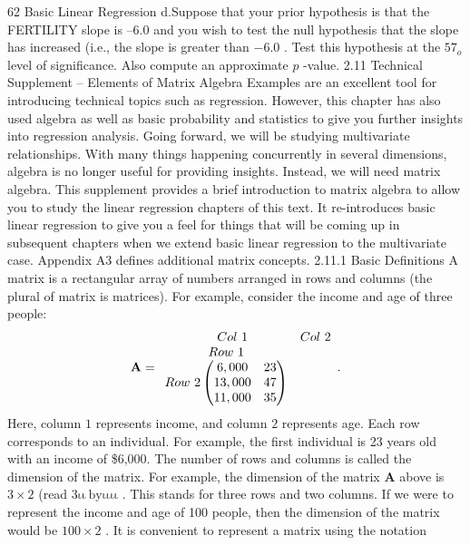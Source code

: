 \documentclass[11pt]{article}
\begin{document}
62 Basic Linear Regression
d.Suppose that your prior hypothesis is that the FERTILITY slope is --6.0
 and you wish to test the null hypothesis that the slope has increased
(i.e., the slope is greater than \(- 6 . 0\) . Test this hypothesis at the \(5 7_{o}\)
 level of significance. Also compute an approximate \(p\) -value.
 2.11 Technical Supplement -- Elements of Matrix Algebra
Examples are an excellent tool for introducing technical topics such as regression.
However, this chapter has also used algebra as well as basic probability and
statistics to give you further insights into regression analysis. Going forward,
we will be studying multivariate relationships. With many things happening
concurrently in several dimensions, algebra is no longer useful for providing
insights. Instead, we will need matrix algebra. This supplement provides a brief
 introduction to matrix algebra to allow you to study the linear regression chapters
 of this text. It re-introduces basic linear regression to give you a feel for things that
will be coming up in subsequent chapters when we extend basic linear regression
 to the multivariate case. Appendix A3 defines additional matrix concepts.
 2.11.1 Basic Definitions
A matrix is a rectangular array of numbers arranged in rows and columns (the
 plural of matrix is matrices). For example, consider the income and age of three
people:
\[
\mathbf{A}=\begin{array} {c c} {\quad C o l \ 1} & {C o l \ 2} \\ {R o w \ 1} \\ {R o w \ 2 \left( \begin{matrix} {6 , 0 0 0} & {2 3} \\ {1 3 , 0 0 0} & {4 7} \\ {1 1 , 0 0 0} & {3 5} \\ \end{matrix} \right)} \\ \end{array} .
\]
Here, column \(1\) represents income, and column \(2\) represents age. Each row
corresponds to an individual. For example, the first individual is 23 years old
with an income of \$6,000.
The number of rows and columns is called the dimension of the matrix. For
example, the dimension of the matrix \(\mathbf{A}\) above is \(3 \times2\) (read \(3 \mathrm{\iota\iota\ b y \iota\iota\iota\iota}\) . This
stands for three rows and two columns. If we were to represent the income and
 age of 100 people, then the dimension of the matrix would be \(1 0 0 \times2\) .
It is convenient to represent a matrix using the notation
\end{document}
